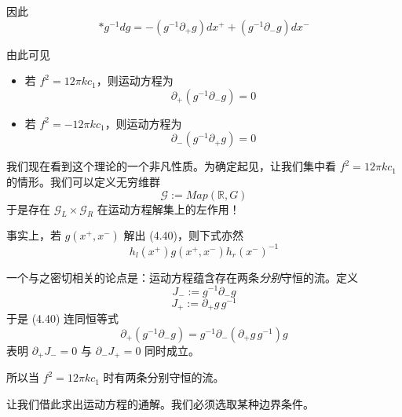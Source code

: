 因此
\begin{equation}
  \ast g^{-1}dg = -\left(g^{-1}\partial_+ g\right)dx^+ + \left(g^{-1}\partial_- g\right)dx^-
  \tag{4.39}
  \label{eq:4.39}
\end{equation}

由此可见
\begin{itemize}
  \item 若 $f^2=12\pi k c_1$，则运动方程为
  \begin{equation}
    \partial_+\left(g^{-1}\partial_- g\right) = 0
    \tag{4.40}
    \label{eq:4.40}
  \end{equation}
  \item 若 $f^2=-12\pi k c_1$，则运动方程为
  \begin{equation}
    \partial_-\left(g^{-1}\partial_+ g\right) = 0
    \tag{4.41}
    \label{eq:4.41}
  \end{equation}
\end{itemize}

我们现在看到这个理论的一个非凡性质。为确定起见，让我们集中看 $f^2=12\pi k c_1$ 的情形。我们可以定义无穷维群
\begin{equation}
  \mathcal{G} := Map(\mathbb{R}, G)
  \tag{4.42}
  \label{eq:4.42}
\end{equation}
于是存在 $\mathcal{G}_L\times\mathcal{G}_R$ 在运动方程解集上的左作用！

事实上，若 $g(x^+,x^-)$ 解出 (4.40)，则下式亦然
\begin{equation}
  h_l(x^+)g(x^+,x^-)h_r(x^-)^{-1}
  \tag{4.43}
  \label{eq:4.43}
\end{equation}

一个与之密切相关的论点是：运动方程蕴含存在两条\emph{分别}守恒的流。定义
\begin{equation}
  J_- := g^{-1}\partial_- g
  \tag{4.44}
  \label{eq:4.44}
\end{equation}
\begin{equation}
  J_+ := \partial_+ g\,g^{-1}
  \tag{4.45}
  \label{eq:4.45}
\end{equation}
于是 (4.40) 连同恒等式
\begin{equation}
  \partial_+\left(g^{-1}\partial_- g\right) = g^{-1}\partial_-\left(\partial_+ g\,g^{-1}\right)g
  \tag{4.46}
  \label{eq:4.46}
\end{equation}
表明 $\partial_+J_-=0$ 与 $\partial_-J_+=0$ 同时成立。

所以当 $f^2=12\pi k c_1$ 时有两条分别守恒的流。

让我们借此求出运动方程的通解。我们必须选取某种边界条件。

